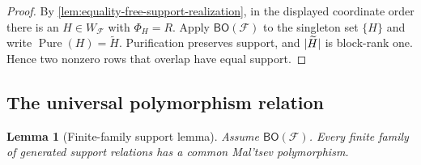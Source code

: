 \documentclass[11pt]{article}
\theoremstyle{plain}
\newtheorem{lemma}[lemma]{Lemma}
\theoremstyle{definition}
\theoremstyle{remark}
\newcommand{\cF}{\mathcal F}
\newcommand{\BO}{\mathsf{BO}}
\newcommand{\SuppRel}[1]{\Phi_{#1}}
\DeclareMathOperator{\Pure}{Pure}
\DeclarePairedDelimiter{\abs}{\lvert}{\rvert}
\begin{document}
\begin{proof}
By \cref{lem:equality-free-support-realization}, in the displayed coordinate
order there is an $H\in W_{\cF}$ with $\SuppRel H=R$.  Apply $\BO(\cF)$ to
the singleton set $\{H\}$ and write $\Pure(H)=\widetilde H$.  Purification
preserves support, and $\abs{\widetilde H}$ is block-rank one.  Hence two
nonzero rows that overlap have equal support.
\end{proof}

\subsection{The universal polymorphism relation}

\begin{lemma}[Finite-family support lemma]
\label{lem:finite-support-maltsev}
Assume $\BO(\cF)$.  Every finite family of generated support relations has a
common Mal'tsev polymorphism.
\end{lemma}
\end{document}
